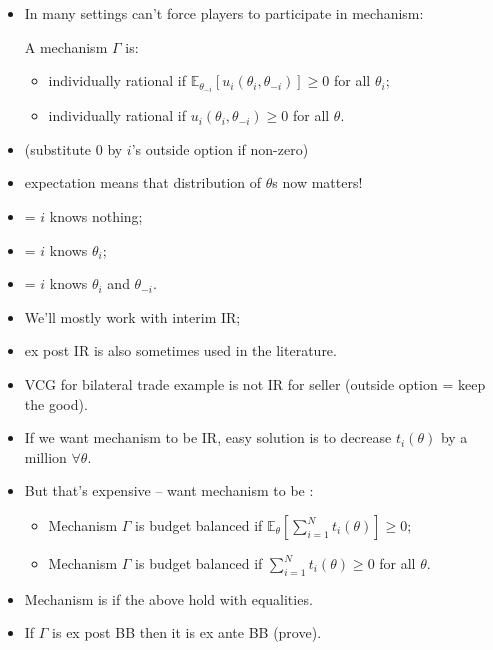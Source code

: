 \documentclass[english,handout,10pt]{beamer}		%
\def\lyxframeend{} %
\begin{document}
\begin{itemize}
	\item In many settings can't force players to participate in mechanism:
	\begin{definition}[IR]
		A mechanism $\Gamma$ is:
		\begin{itemize}
			\item {} \alert{individually rational} if
			$\mathbb{E}_{\theta_{-i}} \left[u_i(\theta_i,\theta_{-i})\right] \geq 0$ for all $\theta_i$;
			\item {} \alert{individually rational} if
			$u_i(\theta_i,\theta_{-i}) \geq 0$ for all $\theta$.
		\end{itemize}
		
		 
	\end{definition}
	\item (substitute $0$ by $i$'s outside option if non-zero)
	\item expectation means that distribution of $\theta$s now matters!
\end{itemize}
\lyxframeend


\begin{itemize}
	\item {} = $i$ knows nothing;
	\item {} = $i$ knows $\theta_i$;
	\item {} = $i$ knows $\theta_i$ and $\theta_{-i}$.
	\item We'll mostly work with interim IR; 
	\item ex post IR is also sometimes used in the literature.
\end{itemize}
\lyxframeend


\begin{itemize}
	\item VCG for bilateral trade example is not IR for seller (outside option = keep the good).
	\pause\medskip
	\item If we want mechanism to be IR, easy solution is to decrease $t_i(\theta)$ by a million $\forall \theta$.
	\item But that's expensive -- want mechanism to be :
	\pause
	\begin{definition}[BB]
		\begin{itemize}
			\item Mechanism $\Gamma$ is  \alert{budget balanced} if $\mathbb{E}_\theta \left[ \sum_{i=1}^N t_i (\theta) \right] \geq 0$;
			\item Mechanism $\Gamma$ is  \alert{budget balanced} if $\sum_{i=1}^N t_i (\theta) \geq 0$ for all $\theta$.
		\end{itemize}
	\end{definition}
	\item Mechanism is  if the above hold with equalities.
	\item If $\Gamma$ is ex post BB then it is ex ante BB (prove).
\end{itemize}
\lyxframeend
\end{document}
